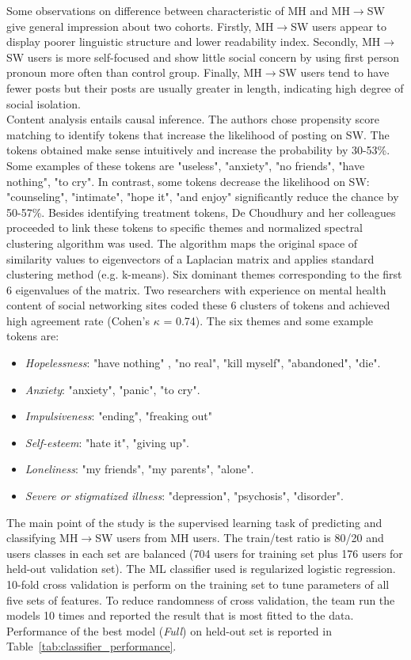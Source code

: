 Some observations on difference between characteristic of MH and  MH$\rightarrow$SW give general impression about two cohorts. Firstly, MH$\rightarrow$SW users appear to display poorer linguistic structure and lower readability index. Secondly,  MH$\rightarrow$SW users is more self-focused and show little social concern by using first person pronoun more often than control group. Finally, MH$\rightarrow$SW users tend to have fewer posts but their posts are usually greater in length, indicating high degree of social isolation.\\
Content analysis entails causal inference. The authors chose propensity score matching to identify tokens that increase the likelihood of posting on SW. The tokens obtained make sense intuitively and increase the probability by 30-53\%. Some examples of these tokens are "useless", "anxiety", "no friends", "have nothing", "to cry". In contrast, some tokens decrease the likelihood on SW: "counseling", "intimate", "hope it", "and enjoy" significantly reduce the chance by 50-57\%. Besides identifying treatment tokens,  De Choudhury and her colleagues proceeded to link these tokens to specific themes and normalized spectral clustering algorithm was used. The algorithm maps the original space of similarity values to eigenvectors of a Laplacian matrix and applies standard clustering method (e.g. k-means). Six dominant themes corresponding to the first 6 eigenvalues of the matrix. Two researchers with experience on mental health content of social networking sites coded these 6 clusters of tokens and achieved high agreement rate (Cohen's $\kappa$ = 0.74). The six themes and some example tokens are:
\begin{itemize}
\item \textit{Hopelessness}: "have nothing" , "no real", "kill myself", "abandoned", "die".
\item \textit{Anxiety}: "anxiety", "panic", "to cry".
\item \textit{Impulsiveness}: "ending", "freaking out"
\item \textit{Self-esteem}: "hate it", "giving up".
\item \textit{Loneliness}: "my friends", "my parents", "alone".
\item \textit{Severe or stigmatized illness}: "depression", "psychosis", "disorder".
\end{itemize}
The main point of the study is the supervised learning task of predicting and classifying MH$\rightarrow$SW users from MH users. The train/test ratio is 80/20 and users classes in each set are balanced (704 users for training set plus 176 users for held-out validation set). The ML classifier used is regularized logistic regression. 10-fold cross validation is perform on the training set to tune parameters of all five sets of features. To reduce randomness of cross validation, the team run the models 10 times and reported the result that is most fitted to the data. Performance of the best model (\textit{Full}) on held-out set is reported in Table~\ref{tab:classifier_performance}.
